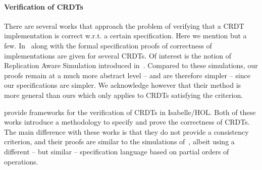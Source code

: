 \paragraph{Verification of CRDTs}
There are several works that approach the problem of verifying that a
CRDT implementation is correct w.r.t. a certain specification.
%
Here we mention but a few.
%
In~\cite{BurckhardtGYZ14, AttiyaBGMYZ16, Burckhardt14} along with the
formal specification proofs of correctness of implementations are
given for several CRDTs.
%
Of interest is the notion of Replication Aware Simulation introduced
in~\cite{BurckhardtGYZ14}.
%
Compared to these simulations, our proofs remain at a much more
abstract level -- and are therefore simpler -- since our
specifications are simpler.
%
We acknowledge however that their method is more general than ours
which only applies to CRDTs satisfying the \CRDTLinshort{} criterion.

\citet{ZellerBP14, GomesKMB17} provide frameworks for the verification
of CRDTs in Isabelle/HOL.
%
Both of these works introduce a methodology to specify and prove the
correctness of CRDTs.
%
The main difference with these works is that they do not provide a
consistency criterion, and their proofs are similar to the simulations
of~\cite{BurckhardtGYZ14}, albeit using a different -- but similar --
specification language based on partial orders of operations.

